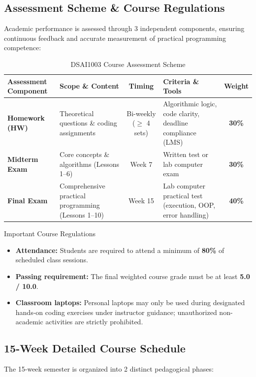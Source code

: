 \documentclass[11pt,a4paper]{article}
\begin{document}
\subsection{Assessment Scheme \& Course Regulations}
Academic performance is assessed through 3 independent components, ensuring continuous feedback and accurate measurement of practical programming competence:

\begin{table}[htbp]
\centering
\small
\begin{tabularx}{\textwidth}{@{}l X c p{4.2cm} c@{}}
\toprule
\textbf{Assessment Component} & \textbf{Scope \& Content} & \textbf{Timing} & \textbf{Criteria \& Tools} & \textbf{Weight} \\
\midrule
\textbf{Homework (HW)} & Theoretical questions \& coding assignments & Bi-weekly ($\ge$ 4 sets) & Algorithmic logic, code clarity, deadline compliance (LMS) & \textbf{30\%} \\
\textbf{Midterm Exam} & Core concepts \& algorithms (Lessons 1--6) & Week 7 & Written test or lab computer exam & \textbf{30\%} \\
\textbf{Final Exam} & Comprehensive practical programming (Lessons 1--10) & Week 15 & Lab computer practical test (execution, OOP, error handling) & \textbf{40\%} \\
\bottomrule
\end{tabularx}
\caption{DSAI1003 Course Assessment Scheme}
\end{table}

\begin{warningbox}{Important Course Regulations}
\begin{itemize}[leftmargin=1.5em, itemsep=2pt]
    \item \textbf{Attendance:} Students are required to attend a minimum of \textbf{80\%} of scheduled class sessions.
    \item \textbf{Passing requirement:} The final weighted course grade must be at least \textbf{5.0 / 10.0}.
    \item \textbf{Classroom laptops:} Personal laptops may only be used during designated hands-on coding exercises under instructor guidance; unauthorized non-academic activities are strictly prohibited.
\end{itemize}
\end{warningbox}

\subsection{15-Week Detailed Course Schedule}
The 15-week semester is organized into 2 distinct pedagogical phases:
\end{document}
